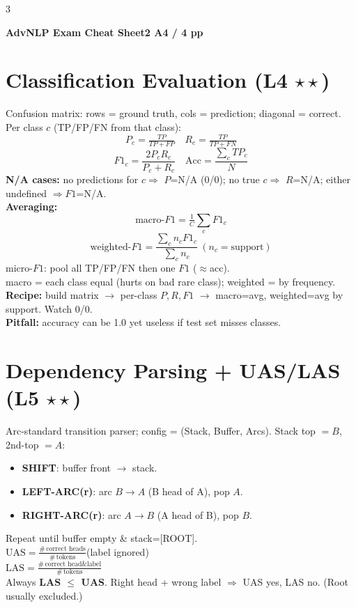\documentclass[12pt]{extarticle} %
\newcommand{\sub}[1]{\textcolor{key}{\textbf{#1}}}
\newcommand{\fb}[1]{\colorbox{yellow!30}{$#1$}} %
\begin{document}
\begin{multicols}{3}
\raggedcolumns

{\color{hdr}\textbf{\normalsize AdvNLP Exam Cheat Sheet}}\hfill\textbf{2 A4 / 4 pp}

\section*{}
\vspace{-12pt}
\section{Classification Evaluation \textnormal{(L4 \(\star\star\))}}
Confusion matrix: rows = ground truth, cols = prediction; diagonal = correct.\\
Per class $c$ (TP/FP/FN from that class):
\[ P_c=\tfrac{TP}{TP+FP}\quad R_c=\tfrac{TP}{TP+FN} \]
\[ F1_c=\frac{2P_cR_c}{P_c+R_c}\quad \text{Acc}=\frac{\sum_c TP_c}{N} \]
\sub{N/A cases:} no predictions for $c\Rightarrow$ $P$=N/A (0/0); no true $c\Rightarrow$ $R$=N/A; either undefined $\Rightarrow F1$=N/A.\\
\sub{Averaging:}
\[ \text{macro-}F1=\tfrac1C\textstyle\sum_c F1_c \]
\[ \text{weighted-}F1=\frac{\sum_c n_c F1_c}{\sum_c n_c}\ (n_c=\text{support}) \]
micro-$F1$: pool all TP/FP/FN then one $F1$ ($\approx$acc).\\
macro = each class equal (hurts on bad rare class); weighted = by frequency.\\
\sub{Recipe:} build matrix $\to$ per-class $P,R,F1$ $\to$ macro=avg, weighted=avg by support. Watch 0/0.\\
\sub{Pitfall:} accuracy can be 1.0 yet useless if test set misses classes.

\section{Dependency Parsing + UAS/LAS \textnormal{(L5 \(\star\star\))}}
Arc-standard transition parser; config = (Stack, Buffer, Arcs). Stack top $=B$, 2nd-top $=A$:
\begin{itemize}
\item \sub{SHIFT}: buffer front $\to$ stack.
\item \sub{LEFT-ARC(r)}: arc $B\!\to\!A$ (B head of A), pop $A$.
\item \sub{RIGHT-ARC(r)}: arc $A\!\to\!B$ (A head of B), pop $B$.
\end{itemize}
Repeat until buffer empty \& stack=[ROOT].\\
\fb{\text{UAS}=\tfrac{\#\,\text{correct heads}}{\#\,\text{tokens}}}\quad (label ignored)\\
\fb{\text{LAS}=\tfrac{\#\,\text{correct head\&label}}{\#\,\text{tokens}}}\\
Always \textbf{LAS $\le$ UAS}. Right head + wrong label $\Rightarrow$ UAS yes, LAS no. (Root usually excluded.)


\end{multicols}
\end{document}
